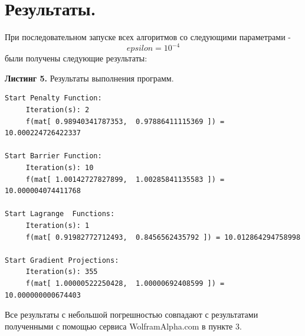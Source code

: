 \documentclass[a4paper, 12pt]{article}   	%
\begin{document}
\newpage

\section{Результаты.}
    При последовательном запуске всех алгоритмов со следующими параметрами -
    \begin{equation}
        epsilon = 10^{-4}
    \end{equation}
    были получены следующие результаты:
    
    \textbf{Листинг 5.} Результаты выполнения программ.
    \begin{verbatim}
Start Penalty Function:
	 Iteration(s): 2
	 f(mat[ 0.98940341787353,  0.97886411115369 ]) = 10.000224726422337

Start Barrier Function:
	 Iteration(s): 10
	 f(mat[ 1.00142727827899,  1.00285841135583 ]) = 10.000004074411768

Start Lagrange  Functions:
	 Iteration(s): 1
	 f(mat[ 0.91982772712493,  0.8456562435792 ]) = 10.012864294758998

Start Gradient Projections:
	 Iteration(s): 355
	 f(mat[ 1.00000522250428,  1.00000692408599 ]) = 10.000000000674403
	 \end{verbatim}
 
Все результаты с небольшой погрешностью совпадают с результатами полученными с помощью сервиса WolframAlpha.com в пункте 3. 
\end{document}
